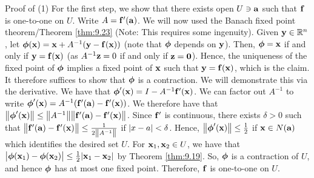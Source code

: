 \begin{nblank}{Proof of (1)}
    For the first step, we show that there exists open $U \ni \mathbf{a}$ such that $\mathbf{f}$ is one-to-one on $U$. Write $A = \mathbf{f}'(\mathbf{a})$. We will now used the Banach fixed point theorem/Theorem \ref{thm:9.23} (Note: This requires some ingenuity). Given $\mathbf{y} \in \mathbb{R}^n$, let $\mbox{\boldmath$ \phi $}(\mathbf{x}) = \mathbf{x} + A^{-1}(\mathbf{y} - \mathbf{f}(\mathbf{x}))$ (note that $\mbox{\boldmath$ \phi $}$ depends on $\mathbf{y}$). Then, $\mbox{\boldmath$ \phi $} = \mathbf{x}$ if and only if $\mathbf{y} = \mathbf{f}(\mathbf{x})$ (as $A^{-1}\mathbf{z} = 0$ if and only if $\mathbf{z} = \mathbf{0}$). Hence, the uniqueness of the fixed point of $\mbox{\boldmath$ \phi $}$ implies a fixed point of $\mathbf{x}$ such that $\mathbf{y} = \mathbf{f}(\mathbf{x})$, which is the claim. It therefore suffices to show that $\mbox{\boldmath$ \phi $}$ is a contraction. We will demonstrate this via the derivative. We have that $\mbox{\boldmath$ \phi $}'(\mathbf{x}) = I - A^{-1}\mathbf{f}'(\mathbf{x})$. We can factor out $A^{-1}$ to write $\mbox{\boldmath$ \phi $}'(\mathbf{x}) = A^{-1}(\mathbf{f}'(\mathbf{a}) - \mathbf{f}'(\mathbf{x}))$. We therefore have that $\norm{\mbox{\boldmath$ \phi $}'(\mathbf{x})} \leq \norm{A^{-1}}\norm{\mathbf{f}'(\mathbf{a}) - \mathbf{f}'(\mathbf{x})}$. Since $\mathbf{f}'$ is continuous, there exists $\delta > 0$ such that $\norm{\mathbf{f}'(\mathbf{a}) - \mathbf{f}'(\mathbf{x})} \leq \frac{1}{2\norm{A^{-1}}}$ if $\abs{x - a} < \delta$. Hence, $\norm{\mbox{\boldmath$ \phi $}'(\mathbf{x})} \leq \frac{1}{2}$ if $\mathbf{x} \in N(\mathbf{a})$ which identifies the desired set $U$. For $\mathbf{x}_1, \mathbf{x}_2 \in U$, we have that $\abs{\mbox{\boldmath$ \phi $}(\mathbf{x}_1) - \mbox{\boldmath$ \phi $}(\mathbf{x}_2)} \leq \frac{1}{2}\abs{\mathbf{x}_1 - \mathbf{x}_2}$ by Theorem \ref{thm:9.19}. So, $\mbox{\boldmath$ \phi $}$ is a contraction of $U$, and hence $\mbox{\boldmath$ \phi $}$ has at most one fixed point. Therefore, $\mathbf{f}$ is one-to-one on $U$.


\end{nblank}
